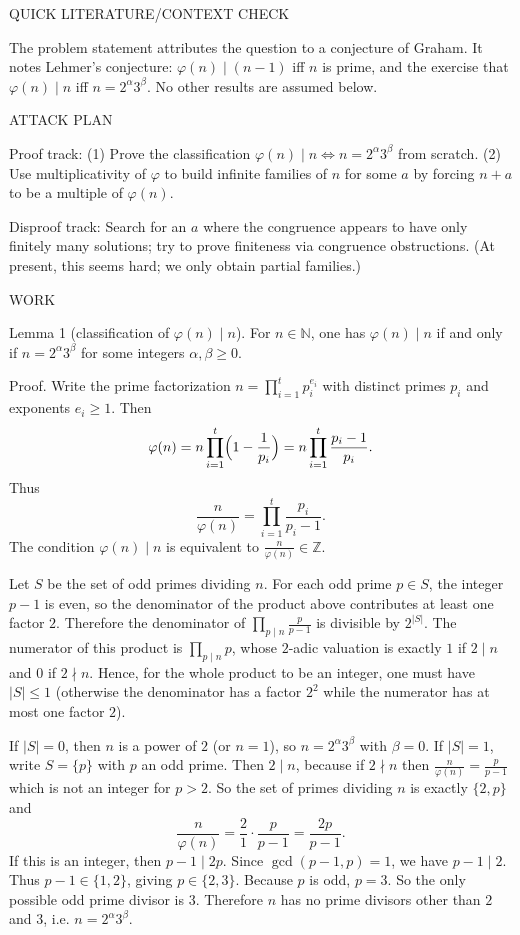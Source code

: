 QUICK LITERATURE/CONTEXT CHECK

The problem statement attributes the question to a conjecture of Graham.
It notes Lehmer's conjecture: $\varphi(n)\mid (n-1)$ iff $n$ is prime, and the exercise that $\varphi(n)\mid n$ iff $n=2^\alpha 3^\beta$.
No other results are assumed below.

ATTACK PLAN

Proof track:
(1) Prove the classification $\varphi(n)\mid n \iff n=2^\alpha 3^\beta$ from scratch.
(2) Use multiplicativity of $\varphi$ to build infinite families of $n$ for some $a$ by forcing $n+a$ to be a multiple of $\varphi(n)$.

Disproof track:
Search for an $a$ where the congruence appears to have only finitely many solutions; try to prove finiteness via congruence obstructions.
(At present, this seems hard; we only obtain partial families.)

WORK

Lemma 1 (classification of $\varphi(n)\mid n$).
For $n\in\mathbb{N}$, one has $\varphi(n)\mid n$ if and only if $n=2^\alpha 3^\beta$ for some integers $\alpha,\beta\ge0$.

Proof.
Write the prime factorization $n=\prod_{i=1}^t p_i^{e_i}$ with distinct primes $p_i$ and exponents $e_i\ge1$.
Then
\[
\varphi(n)=n\prod_{i=1}^t\Bigl(1-\frac1{p_i}\Bigr)=n\prod_{i=1}^t\frac{p_i-1}{p_i}.
\]
Thus
\[
\frac{n}{\varphi(n)}=\prod_{i=1}^t\frac{p_i}{p_i-1}.
\]
The condition $\varphi(n)\mid n$ is equivalent to $\frac{n}{\varphi(n)}\in\mathbb{Z}$.

Let $S$ be the set of odd primes dividing $n$.
For each odd prime $p\in S$, the integer $p-1$ is even, so the denominator of the product above contributes at least one factor $2$.
Therefore the denominator of $\prod_{p\mid n} \frac{p}{p-1}$ is divisible by $2^{|S|}$.
The numerator of this product is $\prod_{p\mid n} p$, whose $2$-adic valuation is exactly $1$ if $2\mid n$ and $0$ if $2\nmid n$.
Hence, for the whole product to be an integer, one must have $|S|\le 1$ (otherwise the denominator has a factor $2^2$ while the numerator has at most one factor $2$).

If $|S|=0$, then $n$ is a power of $2$ (or $n=1$), so $n=2^\alpha 3^\beta$ with $\beta=0$.
If $|S|=1$, write $S=\{p\}$ with $p$ an odd prime.
Then $2\mid n$, because if $2\nmid n$ then $\frac{n}{\varphi(n)}=\frac{p}{p-1}$ which is not an integer for $p>2$.
So the set of primes dividing $n$ is exactly $\{2,p\}$ and
\[
\frac{n}{\varphi(n)}=\frac{2}{1}\cdot \frac{p}{p-1} = \frac{2p}{p-1}.
\]
If this is an integer, then $p-1\mid 2p$.
Since $\gcd(p-1,p)=1$, we have $p-1\mid 2$.
Thus $p-1\in\{1,2\}$, giving $p\in\{2,3\}$.
Because $p$ is odd, $p=3$.
So the only possible odd prime divisor is $3$.
Therefore $n$ has no prime divisors other than $2$ and $3$, i.e.
$n=2^\alpha 3^\beta$.

